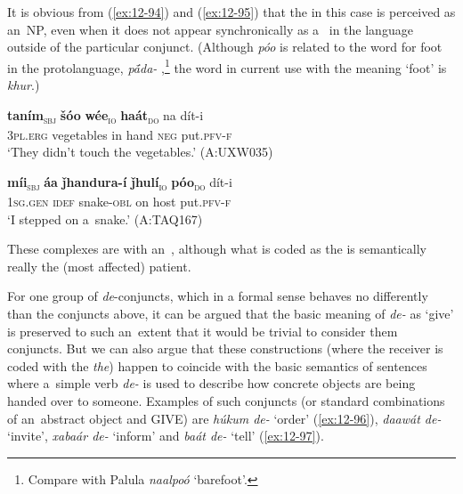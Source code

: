 It is obvious from (\ref{ex:12-94}) and (\ref{ex:12-95}) that the  in this case is
perceived as an~NP, even when it does not appear synchronically as a~ in the language outside of
the particular conjunct. (Although \textit{póo} is related to the word for foot in the protolanguage, \textit{p\'{\={a}}da-} \citep[8056]{turner1966},\footnote{Compare with Palula \textit{naalpoó} `barefoot'.} the word in current use with the meaning `foot' is
\textit{khur}.)

\begin{exe}
\ex
\label{ex:12-94}
\gll {\ob}\textbf{taním}{\cb}\textsubscript{\textsc{\upshape sbj}} {\ob}\textbf{šóo} \textbf{wée}{\cb}\textsubscript{\textsc{\upshape io}} {\ob}\textbf{haát}{\cb}\textsubscript{\textsc{\upshape do}} na dít-i\\
\textsc{3pl.erg} vegetables in hand \textsc{neg} put.\textsc{pfv-f} \\
\glt `They didn't touch the vegetables.' (A:UXW035)
\end{exe}
\begin{exe}
\ex
\label{ex:12-95}
\gll {\ob}\textbf{míi}{\cb}\textsubscript{\textsc{\upshape sbj}} {\ob}\textbf{áa} \textbf{ǰhandura-í} \textbf{ǰhulí}{\cb}\textsubscript{\textsc{\upshape io}} {\ob}\textbf{póo}{\cb}\textsubscript{\textsc{\upshape do}} dít-i\\
\textsc{1sg.gen} \textsc{idef} snake-\textsc{obl} on host put.\textsc{pfv-f}\\
\glt `I stepped on a~snake.' (A:TAQ167)
\end{exe}

These complexes are  with an~, although what is coded as the  is semantically really the (most affected) patient. 


 For one group of \textit{de}-conjuncts, which in a formal sense behaves no differently than the conjuncts above, it can be argued that the basic meaning of \textit{de-} as `give' is preserved to such an~extent that it would be trivial to consider them conjuncts. But we can also argue that these constructions (where the receiver is coded with the  \textit{the}) happen to coincide with the basic semantics of sentences where a~simple verb \textit{de-} is used to describe how concrete objects are being handed over to someone. Examples of such conjuncts (or standard combinations of an~abstract object and GIVE) are \textit{húkum de-} `order' (\ref{ex:12-96}), \textit{daawát de-} `invite', \textit{xabaár de-} `inform' and \textit{baát de-} `tell' (\ref{ex:12-97}).


